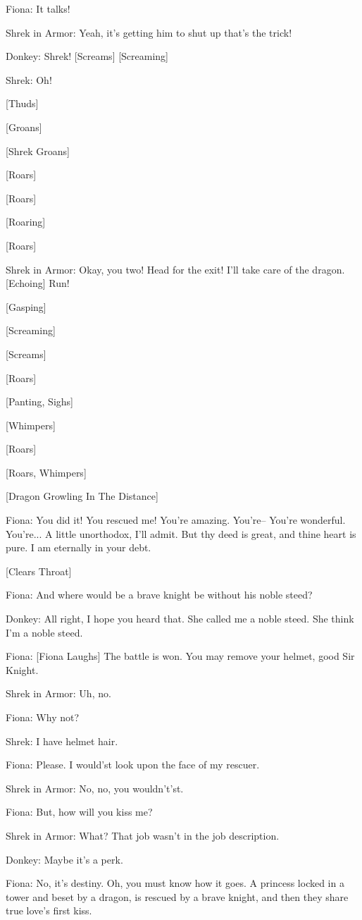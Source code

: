 \documentclass{article}
\begin{document}
Fiona:
It talks!

Shrek in Armor:
Yeah, it's getting him to shut up that's the trick!

Donkey:
Shrek! [Screams] [Screaming]

Shrek:
Oh!

[Thuds]

[Groans]

[Shrek Groans]

[Roars]

[Roars]

[Roaring]

[Roars]

Shrek in Armor:
Okay, you two! Head for the exit! I'll take care of the dragon. [Echoing] Run!

[Gasping]

[Screaming]

[Screams]

[Roars]

[Panting, Sighs]

[Whimpers]

[Roars]

[Roars, Whimpers]

[Dragon Growling In The Distance]

Fiona:
You did it! You rescued me! You're amazing. You're-- You're wonderful. You're... A little unorthodox, I'll admit. But thy deed is great, and thine heart is pure. I am eternally in your debt.

[Clears Throat]

Fiona:
And where would be a brave knight be without his noble steed?

Donkey:
All right, I hope you heard that. She called me a noble steed. She think I'm a noble steed.

Fiona:
[Fiona Laughs] The battle is won. You may remove your helmet, good Sir Knight.

Shrek in Armor:
Uh, no.

Fiona:
Why not?

Shrek:
I have helmet hair.

Fiona:
Please. I would'st look upon the face of my rescuer.

Shrek in Armor:
No, no, you wouldn't'st.

Fiona:
But, how will you kiss me?

Shrek in Armor:
What? That job wasn't in the job description.

Donkey:
Maybe it's a perk.

Fiona:
No, it's destiny. Oh, you must know how it goes. A princess locked in a tower and beset by a dragon, is rescued by a brave knight, and then they share true love's first kiss.
\end{document}
